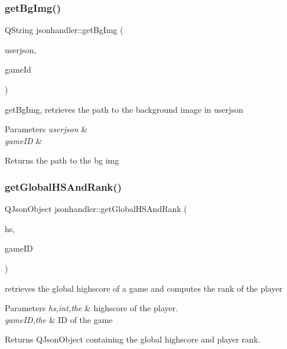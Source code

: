 \subsubsection{\texorpdfstring{get\+Bg\+Img()}{getBgImg()}}
{\footnotesize\ttfamily Q\+String jsonhandler\+::get\+Bg\+Img (\begin{DoxyParamCaption}\item[{Q\+Json\+Object}]{userjson,  }\item[{Q\+String}]{game\+Id }\end{DoxyParamCaption})}



get\+Bg\+Img, retrieves the path to the background image in userjson 


\begin{DoxyParams}{Parameters}
{\em userjson} & \\
\hline
{\em game\+ID} & \\
\hline
\end{DoxyParams}
\begin{DoxyReturn}{Returns}
the path to the bg img 
\end{DoxyReturn}
\mbox{\label{classjsonhandler_ab702fe91f4f95c309d7fed4402b05dcc}} 
\subsubsection{\texorpdfstring{get\+Global\+H\+S\+And\+Rank()}{getGlobalHSAndRank()}}
{\footnotesize\ttfamily Q\+Json\+Object jsonhandler\+::get\+Global\+H\+S\+And\+Rank (\begin{DoxyParamCaption}\item[{int}]{hs,  }\item[{Q\+String}]{game\+ID }\end{DoxyParamCaption})}



retrieves the global highscore of a game and computes the rank of the player 


\begin{DoxyParams}{Parameters}
{\em hs,int,the} & highscore of the player. \\
\hline
{\em game\+ID,the} & ID of the game \\
\hline
\end{DoxyParams}
\begin{DoxyReturn}{Returns}
Q\+Json\+Object containing the global highscore and player rank. 
\end{DoxyReturn}
\mbox{\label{classjsonhandler_ad1a3458ade52adb1e44fdf147450f60b}} 

